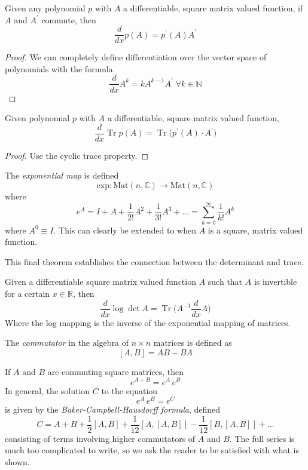 \documentclass{article}
\DeclareMathOperator{\Tr}{Tr}
\begin{document}
    \begin{corollary}
    Given any polynomial $p$ with $A$ a differentiable, square matrix valued function, if $A$ and $A^\prime$ commute, then 
    \[\frac{d}{d x} p(A) = p^\prime (A) A^\prime\]
    \end{corollary}
    \begin{proof}
    We can completely define differentiation over the vector space of polynomials with the formula
    \[\frac{d}{d x} A^k = k A^{k-1} A^\prime \; \forall k \in \mathbb{N}\]
    \end{proof}

    \begin{corollary}
    Given polynomial $p$ with $A$ a differentiable, square matrix valued function, 
    \[\frac{d}{d x} \Tr{p(A)} = \Tr{\big( p^\prime(A) \cdot A^\prime \big)}\]
    \end{corollary}
    \begin{proof}
    Use the cyclic trace property.
    \end{proof}

    \begin{definition}
    The \textit{exponential map} is defined
    \[\text{exp}: \text{Mat}(n, \mathbb{C}) \longrightarrow \text{Mat}(n, \mathbb{C})\]
    where 
    \[e^A = I + A + \frac{1}{2!} A^2 + \frac{1}{3!} A^3 + ... = \sum_{k=0}^\infty \frac{1}{k!} A^k\]
    where $A^0 \equiv I$. This can clearly be extended to when $A$ is a square, matrix valued function. 
    \end{definition}

    This final theorem establishes the connection between the determinant and trace. 

    \begin{theorem}
    Given a differentiable square matrix valued function $A$ such that $A$ is invertible for a certain $x \in \mathbb{R}$, then 
    \[\frac{d}{d x} \log{\det{A}} = \Tr \bigg( A^{-1} \frac{d}{d x} A \bigg)\]
    Where the log mapping is the inverse of the exponential mapping of matrices. 
    \end{theorem}

    \begin{definition}
    The \textit{commutator} in the algebra of $n \times n$ matrices is defined as 
    \[[A, B] = A B - B A\]
    \end{definition}

    \begin{theorem}
    If $A$ and $B$ are commuting square matrices, then 
    \[e^{A + B} = e^A \, e^B\]
    In general, the solution $C$ to the equation
    \[e^{A} \, e^B = e^C\]
    is given by the \textit{Baker-Campbell-Hausdorff formula}, defined
    \[C = A + B + \frac{1}{2}[A,B] + \frac{1}{12} [A,[A,B]] - \frac{1}{12} [B,[A,B]] + ...\]
    consisting of terms involving higher commutators of $A$ and $B$. The full series is much too complicated to write, so we ask the reader to be satisfied with what is shown. 
    \end{theorem}
\end{document}
